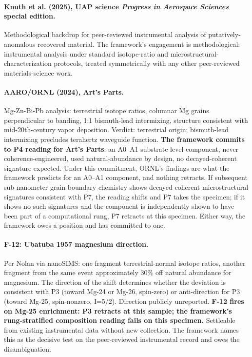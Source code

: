 \documentclass[11pt,a4paper]{article}
\begin{document}
\paragraph{Knuth et al. (2025), UAP science \emph{Progress in Aerospace Sciences} special edition.} Methodological backdrop for peer-reviewed instrumental analysis of putatively-anomalous recovered material. The framework's engagement is methodological: instrumental analysis under standard isotope-ratio and microstructural-characterization protocols, treated symmetrically with any other peer-reviewed materials-science work.

\paragraph{AARO/ORNL (2024), Art's Parts.} Mg-Zn-Bi-Pb analysis: terrestrial isotope ratios, columnar Mg grains perpendicular to banding, 1:1 bismuth-lead intermixing, structure consistent with mid-20th-century vapor deposition. Verdict: terrestrial origin; bismuth-lead intermixing precludes terahertz waveguide function. \textbf{The framework commits to P4 reading for Art's Parts}: an A0--A1 substrate-level component, never coherence-engineered, used natural-abundance by design, no decayed-coherent signature expected. Under this commitment, ORNL's findings are what the framework predicts for an A0--A1 component, and nothing retracts. If subsequent sub-nanometer grain-boundary chemistry shows decayed-coherent microstructural signatures consistent with P7, the reading shifts and P7 takes the specimen; if it shows no such signatures and the component is independently shown to have been part of a computational rung, P7 retracts at this specimen. Either way, the framework owes a position and has committed to one.

\paragraph{F-12: Ubatuba 1957 magnesium direction.} Per Nolan via nanoSIMS: one fragment terrestrial-normal isotope ratios, another fragment from the same event approximately 30\% off natural abundance for magnesium. The direction of the shift determines whether the deviation is consistent with P3 (toward Mg-24 or Mg-26, spin-zero) or anti-direction for P3 (toward Mg-25, spin-nonzero, I=5/2). Direction publicly unreported. \textbf{F-12 fires on Mg-25 enrichment: P3 retracts at this sample; the framework's rung-stratified composition reading fails on this specimen.} Settleable from existing instrumental data without new collection. The framework names this as the decisive test on the peer-reviewed instrumental record and owes the disambiguation.
\end{document}
